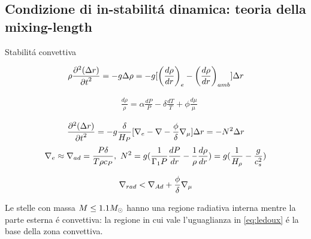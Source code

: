 \subsection{Condizione di in-stabilit\'a dinamica: teoria della mixing-length}

\begin{frame}{Stabilit\'a convettiva}

\begin{equation}
\rho\PtwoDy{t}{(\Delta r)}=-g\Delta\rho=-g[\Dcvar{\TDy{r}{\rho}}{e}-\Dcvar{\TDy{r}{\rho}}{amb}]\Delta r
\end{equation}

\begin{align}
&\frac{d\rho}{\rho}=\alpha\frac{dP}{P}-\delta\frac{dT}{T}+\phi\frac{d\mu}{\mu}\label{eq:deltatherm}
\end{align}

\begin{equation}
\PtwoDy{t}{(\Delta r)}=-g\frac{\delta}{H_P}[\nabla_e-\nabla-\frac{\phi}{\delta}\nmu{}]\Delta r=-N^2\Delta r
\label{eq:galleggiamento}
\end{equation}
\begin{equation*}
\nabla_e\approx\nabla_{ad}=\frac{P\delta}{T\rho c_P},\ N^2=g(\frac{1}{\Gamma_1P}\TDy{r}{P}-\frac{1}{\rho}\TDy{r}{\rho})=g(\frac{1}{\densityscale{}}-\frac{g}{c_s^2})
\end{equation*}

\begin{equation}
\nrad{}<\nad+\frac{\phi}{\delta}\nmu{}\label{eq:ledoux}
\end{equation}

Le stelle con massa $M\leq1.1\msun{}$ hanno una regione radiativa interna mentre la parte esterna \'e convettiva: la regione in cui vale l'uguaglianza in \eqref{eq:ledoux} \'e la base della zona convettiva.

\end{frame}



